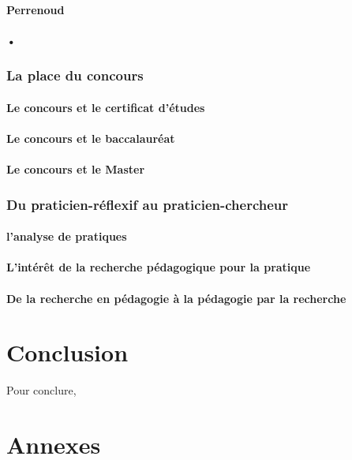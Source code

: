 \documentclass[a4paper,11pt]{article}
\begin{document}
			\subsection{Perrenoud}
			\subsection{•}


\section{La place du concours}

			\subsection{Le concours et le certificat d'études}
			\subsection{Le concours et le baccalauréat}
			\subsection{Le concours et le Master}
			
\section{Du praticien-réflexif au praticien-chercheur}

			\subsection{l'analyse de pratiques}
			\subsection{L'intérêt de la recherche pédagogique pour la pratique}
			\subsection{De la recherche en pédagogie à la pédagogie par la recherche}



\part*{Conclusion}
Pour conclure,


\part*{Annexes}
\label{annexe1}

\nocite{*}


\end{document}
